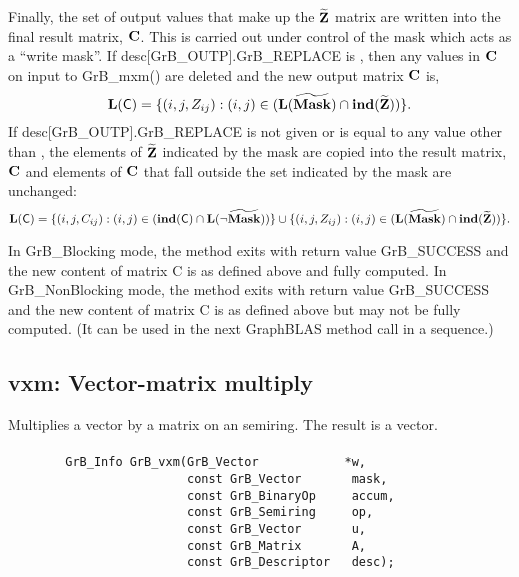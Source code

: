 Finally, the set of output values that make up the ${\bf \widetilde{Z}}$ matrix are written into the final result matrix, ${\bf C}$. 
This is carried out under control of the mask which acts as a ``write mask''.
If {\sf desc[GrB\_OUTP].GrB\_REPLACE} is \true, then any values in ${\bf C}$ on input to {\sf GrB\_mxm()} are deleted and the new
output matrix ${\bf C}$ is,
\[ \bold{L}({\sf C}) = \{(i,j,Z_{ij}) : (i,j) \in (\bold{L}({\bf \widetilde{Mask}}) \cap \bold{ind}({\bf \widetilde{Z}})) \}. \]
If {\sf desc[GrB\_OUTP].GrB\_REPLACE} is not given or is equal to any value other than \true, the elements of ${\bf \widetilde{Z}}$ indicated by the mask
are copied into the result matrix, ${\bf C}$ and elements of ${\bf C}$  that fall outside the set indicated by the mask are unchanged:
\[ \bold{L}({\sf C}) = \{(i,j,C_{ij}) : (i,j) \in (\bold{ind}({\bf \sf C}) \cap \bold{L}(\neg {\bf \widetilde{Mask}})) \} \cup \{(i,j,Z_{ij}) : (i,j) \in (\bold{L}({\bf \widetilde{Mask}}) \cap \bold{ind}({\bf \widetilde{Z}})) \}. \]

In {\sf GrB\_Blocking} mode, the method exits with return value {\sf GrB\_SUCCESS} and the new content of matrix {\sf C} is as defined above and fully computed.
In {\sf GrB\_NonBlocking} mode, the method exits with return value {\sf GrB\_SUCCESS} and the new content of matrix {\sf C} is as defined above but may not be fully computed. (It can be used in the next GraphBLAS method call in a sequence.)


\subsection{{\sf vxm}: Vector-matrix multiply}

Multiplies a vector by a matrix on an semiring. The result is a vector.

\paragraph{\syntax}

\begin{verbatim}
        GrB_Info GrB_vxm(GrB_Vector            *w,
                         const GrB_Vector       mask,
                         const GrB_BinaryOp     accum,
                         const GrB_Semiring     op,
                         const GrB_Vector       u, 
                         const GrB_Matrix       A,
                         const GrB_Descriptor   desc);
\end{verbatim}

